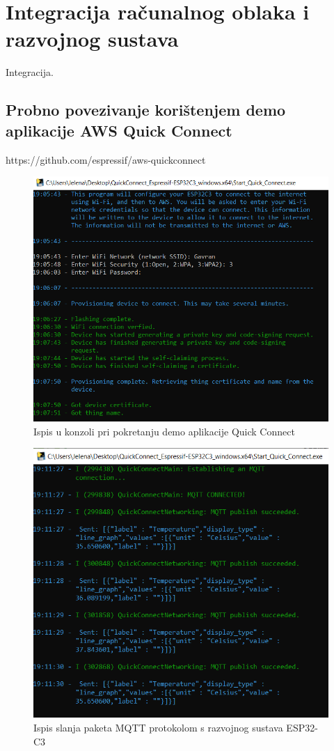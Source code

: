 \chapter{Integracija računalnog oblaka i razvojnog sustava}

Integracija.

\section{Probno povezivanje korištenjem demo aplikacije AWS Quick Connect}

https://github.com/espressif/aws-quickconnect

\begin{figure}[ht]
	\centering
	\includegraphics[scale=0.5]{imgs/aws_esp32_easy_connect}
	\caption{Ispis u konzoli pri pokretanju demo aplikacije Quick Connect}
	\label{fig:aws_esp32_easy_connect}
\end{figure}

\begin{figure}[ht]
	\centering
	\includegraphics[scale=0.5]{imgs/esp32_easy_connect_mqtt_packages}
	\caption{Ispis slanja paketa MQTT protokolom s razvojnog sustava ESP32-C3}
	\label{fig:esp32_easy_connect_mqtt_packages}
\end{figure}

\eject